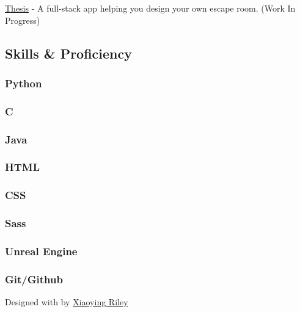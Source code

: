 \documentclass[english,]{article}
\begin{document}
{ \protect\hyperlink{hook}{Thesis} } - {A full-stack app helping you
design your own escape room. (Work In Progress)}

\hypertarget{skills-proficiency}{%
\subsection{\texorpdfstring{{ \emph{} \emph{} } Skills \&
Proficiency}{    Skills \& Proficiency}}\label{skills-proficiency}}

\hypertarget{python}{%
\subsubsection{Python}\label{python}}

\hypertarget{c}{%
\subsubsection{C}\label{c}}

\hypertarget{java}{%
\subsubsection{Java}\label{java}}

\hypertarget{html}{%
\subsubsection{HTML}\label{html}}

\hypertarget{css}{%
\subsubsection{CSS}\label{css}}

\hypertarget{sass}{%
\subsubsection{Sass}\label{sass}}

\hypertarget{unreal-engine}{%
\subsubsection{Unreal Engine}\label{unreal-engine}}

\hypertarget{gitgithub}{%
\subsubsection{Git/Github}\label{gitgithub}}

{Designed with \emph{} by \href{http://themes.3rdwavemedia.com}{Xiaoying
Riley}}
\end{document}

